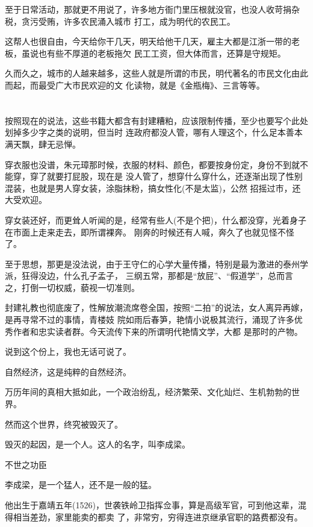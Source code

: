 \documentclass[11pt,a4paper,onecolumn]{article}
\begin{document}
至于日常活动，那就更不用说了，许多地方衙门里压根就没官，也没人收苛捐杂税，贪污受贿，许多农民涌入城市
打工，成为明代的农民工。

这帮人也很自由，今天给你干几天，明天给他干几天，雇主大都是江浙一带的老板，虽说也有些不厚道的老板拖欠
民工工资，但大体而言，还算是守规矩。

久而久之，城市的人越来越多，这些人就是所谓的市民，明代著名的市民文化由此而起，而最受广大市民欢迎的文
化读物，就是《金瓶梅》、三言等等。

\section[\thesection]{}

按照现在的说法，这些书籍大都含有封建糟粕，应该限制传播，至少也要写个此处划掉多少字之类的说明，但当时
连政府都没人管，哪有人理这个，什么足本善本满天飘，肆无忌惮。

穿衣服也没谱，朱元璋那时候，衣服的材料、颜色，都要按身份定，身份不到就不能穿，穿了就要打屁股，现在是
没人管了，想穿什么穿什么，还逐渐出现了性别混装，也就是男人穿女装，涂脂抹粉，搞女性化(不是太监)，公然
招摇过市，还大受欢迎。

穿女装还好，而更耸人听闻的是，经常有些人(不是个把)，什么都没穿，光着身子在市面上走来走去，即所谓裸奔。
刚奔的时候还有人喊，奔久了也就见怪不怪了。

至于思想，那更是没法说，由于王守仁的心学大量传播，特别是最为激进的泰州学派，狂得没边，什么孔子孟子，
三纲五常，那都是``放屁''、``假道学''，总而言之，打倒一切权威，藐视一切准则。

封建礼教也彻底废了，性解放潮流席卷全国，按照``二拍''的说法，女人离异再嫁，是再寻常不过的事情，青楼妓
院如雨后春笋，艳情小说极其流行，涌现了许多优秀作者和忠实读者群。今天流传下来的所谓明代艳情文学，大都
是那时的产物。

说到这个份上，我也无话可说了。

自然经济，这是纯粹的自然经济。

万历年间的真相大抵如此，一个政治纷乱，经济繁荣、文化灿烂、生机勃勃的世界。

然而这个世界，终究被毁灭了。

毁灭的起因，是一个人。这人的名字，叫李成梁。

不世之功臣

李成梁，是一个猛人，还不是一般的猛。

他出生于嘉靖五年(1526)，世袭铁岭卫指挥佥事，算是高级军官，可到他这辈，混得相当差劲，家里能卖的都卖
了，非常穷，穷得连进京继承官职的路费都没有。
\end{document}
